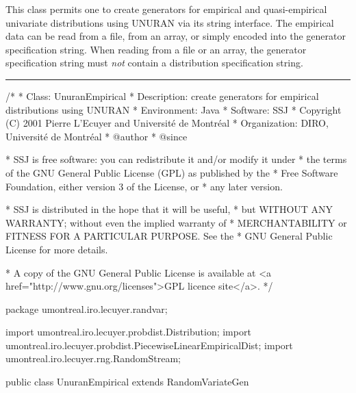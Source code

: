 
This class permits one to create generators for empirical and 
quasi-empirical univariate distributions
using UNURAN via its string interface.
The empirical data can be read from a file, from an array, or simply
encoded into the generator specification string.  
When reading from a file or an array, the generator specification 
string must \emph{not} contain a distribution specification string.

\bigskip\hrule

\begin{code}
\begin{hide}
/*
 * Class:        UnuranEmpirical
 * Description:  create generators for empirical distributions using UNURAN
 * Environment:  Java
 * Software:     SSJ 
 * Copyright (C) 2001  Pierre L'Ecuyer and Université de Montréal
 * Organization: DIRO, Université de Montréal
 * @author       
 * @since

 * SSJ is free software: you can redistribute it and/or modify it under
 * the terms of the GNU General Public License (GPL) as published by the
 * Free Software Foundation, either version 3 of the License, or
 * any later version.

 * SSJ is distributed in the hope that it will be useful,
 * but WITHOUT ANY WARRANTY; without even the implied warranty of
 * MERCHANTABILITY or FITNESS FOR A PARTICULAR PURPOSE.  See the
 * GNU General Public License for more details.

 * A copy of the GNU General Public License is available at
   <a href="http://www.gnu.org/licenses">GPL licence site</a>.
 */
\end{hide}
package umontreal.iro.lecuyer.randvar;\begin{hide}
import umontreal.iro.lecuyer.probdist.Distribution;
import umontreal.iro.lecuyer.probdist.PiecewiseLinearEmpiricalDist;
import umontreal.iro.lecuyer.rng.RandomStream;\end{hide} 

public class UnuranEmpirical extends RandomVariateGen\begin{hide} {
   private RandUnuran unuran = new RandUnuran();
\end{hide}\end{code}

